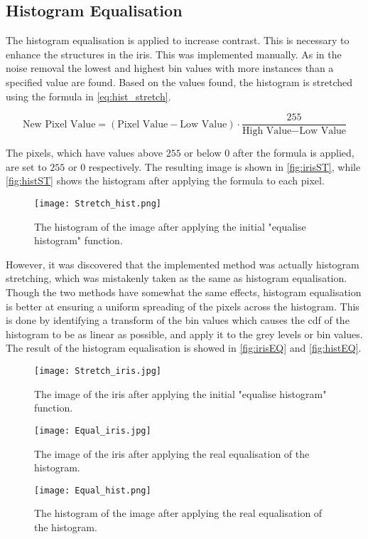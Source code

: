 \subsection{Histogram Equalisation}
\label{sec:HistEq}
The histogram equalisation is applied to increase contrast. This is necessary to enhance the structures in the iris. This was implemented manually. As in the noise removal the lowest and highest bin values with more instances than a specified value are found. Based on the values found, the histogram is stretched using the formula in \autoref{eq:hist_stretch}.

\begin{equation}\label{eq:hist_stretch}
	\text{New~Pixel~Value}=(\text{Pixel~Value}-\text{Low~Value})\cdot\frac{255}{\text{High~Value}-\text{Low~Value}}
\end{equation}

The pixels, which have values above $ 255 $ or below $ 0 $ after the formula is applied, are set to $ 255 $ or $ 0 $ respectively. The resulting image is shown in \autoref{fig:irisST}, while \autoref{fig:histST} shows the histogram after applying the formula to each pixel.

\begin{figure}[H]
\centering
\texttt{[image: Stretch\_hist.png]}
\caption{The histogram of the image after applying the initial "equalise histogram" function.}
\label{fig:histST}
\end{figure}

However, it was discovered that the implemented method was actually histogram stretching, which was mistakenly taken as the same as histogram equalisation. Though the two methods have somewhat the same effects, histogram equalisation is better at ensuring a uniform spreading of the pixels across the histogram. 
This is done by identifying a transform of the bin values which causes the \gls{cdf} of the histogram to be as linear as possible, and apply it to the grey levels or bin values. The result of the histogram equalisation is showed in \autoref{fig:irisEQ} and \autoref{fig:histEQ}.

\begin{figure}[H]
\centering
\texttt{[image: Stretch\_iris.jpg]}
\caption{The image of the iris after applying the initial "equalise histogram" function.}
\label{fig:irisST}
\end{figure}
\begin{figure}[H]
\centering
\texttt{[image: Equal\_iris.jpg]}
\caption{The image of the iris after applying the real equalisation of the histogram.}
\label{fig:irisEQ}
\end{figure}
\begin{figure}[h]
\centering
\texttt{[image: Equal\_hist.png]}
\caption{The histogram of the image after applying the real equalisation of the histogram.}
\label{fig:histEQ}
\end{figure}

